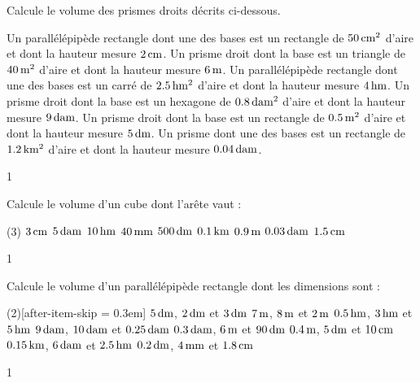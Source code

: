 \documentclass[a4paper,11pt]{report}
\begin{document}
\begin{exo}{
Calcule le volume des prismes droits décrits ci-dessous.
\begin{tasks}[after-item-skip = 0.2em]
    \task Un parallélépipède rectangle dont une des bases est un rectangle de $\tunit{50}{\centi m^2}$ d'aire et dont la hauteur mesure $\tunit{2}{\centi m}$.
    \task Un prisme droit dont la base est un triangle de $\tunit{40}{m^2}$ d'aire et dont la hauteur mesure $\tunit{6}{m}$.
    \task Un parallélépipède rectangle dont une des bases est un carré de $\tunit{2,5}{\hecto m^2}$ d'aire et dont la hauteur mesure $\tunit{4}{\hecto m}$.
    \task Un prisme droit dont la base est un hexagone de $\tunit{0,8}{\deca m^2}$ d'aire et dont la hauteur mesure $\tunit{9}{\deca m}$.
    \task Un prisme droit dont la base est un rectangle de $\tunit{0,5}{m^2}$ d'aire et dont la hauteur mesure $\tunit{5}{\deci m}$.
    \task Un prisme dont une des bases est un rectangle de $\tunit{1,2}{\kilo m^2}$ d'aire et dont la hauteur mesure $\tunit{0,04}{\deca m}$.
\end{tasks}
\vspace{-0.3cm}
}{1}
\end{exo}


\begin{exo}{
Calcule le volume d'un cube dont l'arête vaut :
\begin{tasks}[after-item-skip = 0.3em](3)
    \task $\tunit{3}{\centi m}$
    \task $\tunit{5}{\deca m}$
    \task $\tunit{10}{\hecto m}$
    \task $\tunit{40}{\milli m}$
    \task $\tunit{500}{\deci m}$
    \task $\tunit{0,1}{\kilo m}$
    \task $\tunit{0,9}{m}$
    \task $\tunit{0,03}{\deca m}$
    \task $\tunit{1,5}{\centi m}$
\end{tasks}
}{1}
\end{exo}

\begin{exo}{
Calcule le volume d'un parallélépipède rectangle dont les dimensions sont :
\begin{tasks}(2)[after-item-skip = 0.3em]
    \task  $\tunit{5}{\deci m}$, $\tunit{2}{\deci m}$ et $\tunit{3}{\deci m}$
    \task  $\tunit{7}{m}$, $\tunit{8}{m}$ et $\tunit{2}{m}$
    \task  $\tunit{0,5}{\hecto m}$, $\tunit{3}{\hecto m}$ et $\tunit{5}{\hecto m}$
    \task  $\tunit{9}{\deca m}$, $\tunit{10}{\deca m}$ et $\tunit{0,25}{\deca m}$
    \task  $\tunit{0,3}{\deca m}$, $\tunit{6}{m}$ et $\tunit{90}{\deci m}$
    \task  $\tunit{0,4}{m}$, $\tunit{5}{\deci m}$ et $\tunit{10}{\centi m}$
    \task  $\tunit{0,15}{\kilo m}$, $\tunit{6}{\deca m}$ et $\tunit{2,5}{\hecto m}$
    \task  $\tunit{0,2}{\deci m}$, $\tunit{4}{\milli m}$ et $\tunit{1,8}{\centi m}$
\end{tasks}
\vspace{-0.3cm}
}{1}
\end{exo}
\end{document}
